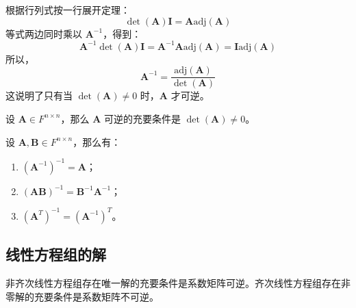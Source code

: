 \begin{note}
    根据行列式按一行展开定理：
    \[
        \det(\mathbf{A}) \mathbf{I} = \mathbf{A}\mathrm{adj}(\mathbf{A})
    \]
    等式两边同时乘以 $\mathbf{A}^{-1}$，得到：
    \[
        \mathbf{A}^{-1}\det(\mathbf{A}) \mathbf{I} = \mathbf{A}^{-1}\mathbf{A}\mathrm{adj}(\mathbf{A}) = \mathbf{I}\mathrm{adj}(\mathbf{A})
    \]
    所以，
    \[
        \mathbf{A}^{-1} = \frac{\mathrm{adj}(\mathbf{A})}{\det(\mathbf{A})}
    \]
    这说明了只有当 $\det(\mathbf{A}) \neq 0$ 时，$\mathbf{A}$ 才可逆。
\end{note}

\begin{proposition}[矩阵可逆的充要条件]
    设 $\mathbf{A} \in F^{n \times n}$，那么 $\mathbf{A}$ 可逆的充要条件是 $\det(\mathbf{A}) \neq 0$。
    \label{prop:matrix_invertible_iff_det_nonzero}
\end{proposition}



\begin{proposition}[矩阵逆的性质]
    设 $\mathbf{A},\mathbf{B} \in F^{n \times n}$，那么有：
    \begin{enumerate}
        \item $(\mathbf{A}^{-1})^{-1} = \mathbf{A}$；
        \item $(\mathbf{A}\mathbf{B})^{-1} = \mathbf{B}^{-1}\mathbf{A}^{-1}$；
        \item $(\mathbf{A}^T)^{-1} = (\mathbf{A}^{-1})^T$。
    \end{enumerate}
\end{proposition}

\vspace{1em}

\subsection{线性方程组的解}

\begin{proposition}
    非齐次线性方程组存在唯一解的充要条件是系数矩阵可逆。齐次线性方程组存在非零解的充要条件是系数矩阵不可逆。
    \label{prop:linear_equations_solutions}
\end{proposition}

